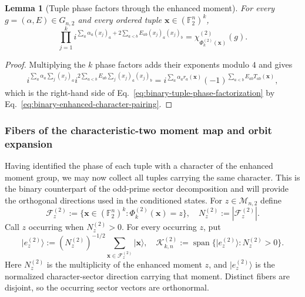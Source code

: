 \documentclass[11pt]{article}
\newcommand{\F}{\mathbb F}
\newcommand{\1}{\mathbf 1}
\newcommand{\ket}[1]{\lvert #1\rangle}
\theoremstyle{plain}
\newtheorem{lemma}[theorem]{Lemma}
\theoremstyle{definition}
\theoremstyle{remark}
\begin{document}
\begin{lemma}[Tuple phase factors through the enhanced moment]
\label{lem:binary-tuple-phase-factorization}
For every $g=(\alpha,E)\in G_{n,2}$ and every ordered tuple
$\boldsymbol x\in(\F_2^n)^k$,
\begin{equation}
 \prod_{j=1}^k
 i^{\sum_a\alpha_a(x_j)_a+2\sum_{a<b}E_{ab}(x_j)_a(x_j)_b}
 =\chi_{\Phi_k^{(2)}(\boldsymbol x)}^{(2)}(g).
 \label{eq:binary-tuple-phase-factorization}
\end{equation}
\end{lemma}
\begin{proof}
Multiplying the $k$ phase factors adds their exponents modulo $4$ and gives
\begin{align}
 i^{\sum_a\alpha_a\sum_j(x_j)_a}
  i^{2\sum_{a<b}E_{ab}\sum_j(x_j)_a(x_j)_b}
 =i^{\sum_a\alpha_a r_a(\boldsymbol x)}
  (-1)^{\sum_{a<b}E_{ab}T_{ab}(\boldsymbol x)},
 \label{eq:binary-tuple-phase-calculation}
\end{align}
which is the right-hand side of
Eq.~\eqref{eq:binary-tuple-phase-factorization} by
Eq.~\eqref{eq:binary-enhanced-character-pairing}.
\end{proof}

\subsubsection{Fibers of the characteristic-two moment map and orbit expansion}
Having identified the phase of each tuple with a character of the enhanced moment group, we may now collect all tuples carrying the same character.  This is the binary counterpart of the odd-prime sector decomposition and will provide the orthogonal directions used in the conditioned states.  For $z\in\mathcal M_{n,2}$ define
\begin{equation}
 \mathcal F_z^{(2)}
 :=\{\boldsymbol x\in(\F_2^n)^k:
          \Phi_k^{(2)}(\boldsymbol x)=z\},
 \quad
 N_z^{(2)}:=|\mathcal F_z^{(2)}|.
 \label{eq:binary-enhanced-moment-fiber}
\end{equation}
Call $z$ occurring when $N_z^{(2)}>0$.  For every occurring $z$, put
\begin{equation}
 \ket{e_z^{(2)}}
 :=(N_z^{(2)})^{-1/2}
   \sum_{\boldsymbol x\in\mathcal F_z^{(2)}}\ket{\boldsymbol x},
 \quad
 \mathcal K_{k,n}^{(2)}
 :=\operatorname{span}\{\ket{e_z^{(2)}}:N_z^{(2)}>0\}.
 \label{eq:integrated-qubit-sector-vector}
\end{equation}
Here $N_z^{(2)}$ is the multiplicity of the enhanced moment $z$, and
$\ket{e_z^{(2)}}$ is the normalized character-sector direction carrying that
moment.  Distinct fibers are disjoint, so the occurring sector vectors are
orthonormal.
\end{document}
